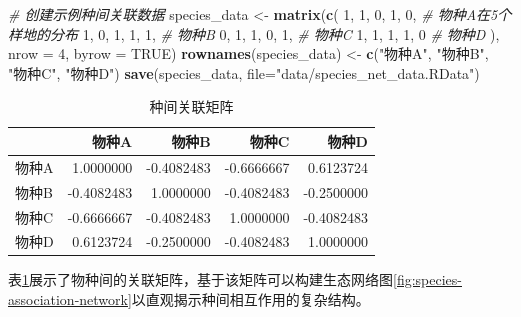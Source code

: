 \documentclass[
  twoside,12pt,fontset=none]{ctexbook}
\newenvironment{Shaded}{\begin{snugshade}}{\end{snugshade}}
\newcommand{\AttributeTok}[1]{\textcolor[rgb]{0.13,0.29,0.53}{#1}}
\newcommand{\CommentTok}[1]{\textcolor[rgb]{0.56,0.35,0.01}{\textit{#1}}}
\newcommand{\ConstantTok}[1]{\textcolor[rgb]{0.56,0.35,0.01}{#1}}
\newcommand{\DecValTok}[1]{\textcolor[rgb]{0.00,0.00,0.81}{#1}}
\newcommand{\FunctionTok}[1]{\textcolor[rgb]{0.13,0.29,0.53}{\textbf{#1}}}
\newcommand{\NormalTok}[1]{#1}
\newcommand{\OtherTok}[1]{\textcolor[rgb]{0.56,0.35,0.01}{#1}}
\newcommand{\StringTok}[1]{\textcolor[rgb]{0.31,0.60,0.02}{#1}}
\begin{document}
\begin{Shaded}
\begin{Highlighting}[]
\CommentTok{\# 创建示例种间关联数据}
\NormalTok{species\_data }\OtherTok{\textless{}{-}} \FunctionTok{matrix}\NormalTok{(}\FunctionTok{c}\NormalTok{(}
  \DecValTok{1}\NormalTok{, }\DecValTok{1}\NormalTok{, }\DecValTok{0}\NormalTok{, }\DecValTok{1}\NormalTok{, }\DecValTok{0}\NormalTok{, }\CommentTok{\# 物种A在5个样地的分布}
  \DecValTok{1}\NormalTok{, }\DecValTok{0}\NormalTok{, }\DecValTok{1}\NormalTok{, }\DecValTok{1}\NormalTok{, }\DecValTok{1}\NormalTok{, }\CommentTok{\# 物种B}
  \DecValTok{0}\NormalTok{, }\DecValTok{1}\NormalTok{, }\DecValTok{1}\NormalTok{, }\DecValTok{0}\NormalTok{, }\DecValTok{1}\NormalTok{, }\CommentTok{\# 物种C}
  \DecValTok{1}\NormalTok{, }\DecValTok{1}\NormalTok{, }\DecValTok{1}\NormalTok{, }\DecValTok{1}\NormalTok{, }\DecValTok{0} \CommentTok{\# 物种D}
\NormalTok{), }\AttributeTok{nrow =} \DecValTok{4}\NormalTok{, }\AttributeTok{byrow =} \ConstantTok{TRUE}\NormalTok{)}
\FunctionTok{rownames}\NormalTok{(species\_data) }\OtherTok{\textless{}{-}} \FunctionTok{c}\NormalTok{(}\StringTok{"物种A"}\NormalTok{, }\StringTok{"物种B"}\NormalTok{, }\StringTok{"物种C"}\NormalTok{, }\StringTok{"物种D"}\NormalTok{)}
\FunctionTok{save}\NormalTok{(species\_data, }\AttributeTok{file=}\StringTok{"data/species\_net\_data.RData"}\NormalTok{)}
\end{Highlighting}
\end{Shaded}

\begin{table}[!h]
\centering
\caption{\label{tab:species-association-matrix-table}种间关联矩阵}
\centering
\begin{tabular}[t]{lrrrr}
\toprule
  & 物种A & 物种B & 物种C & 物种D\\
\midrule
物种A & 1.0000000 & -0.4082483 & -0.6666667 & 0.6123724\\
物种B & -0.4082483 & 1.0000000 & -0.4082483 & -0.2500000\\
物种C & -0.6666667 & -0.4082483 & 1.0000000 & -0.4082483\\
物种D & 0.6123724 & -0.2500000 & -0.4082483 & 1.0000000\\
\bottomrule
\end{tabular}
\end{table}

表\ref{tab:species-association-matrix-table}展示了物种间的关联矩阵，基于该矩阵可以构建生态网络图\ref{fig:species-association-network}以直观揭示种间相互作用的复杂结构。
\end{document}
